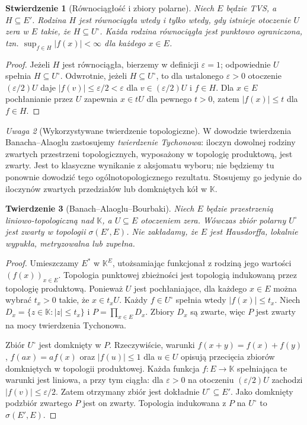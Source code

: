 \documentclass[11pt,a4paper]{article}
\numberwithin{equation}{section}
\theoremstyle{plain}
\newtheorem{twierdzenie}{Twierdzenie}[section]
\newtheorem{stwierdzenie}[twierdzenie]{Stwierdzenie}
\theoremstyle{definition}
\theoremstyle{remark}
\newtheorem{uwaga}[twierdzenie]{Uwaga}
\newcommand{\K}{\mathbb K}
\begin{document}
\begin{stwierdzenie}[Równociągłość i zbiory polarne]\label{prop:equicont-polar}
Niech $E$ będzie TVS, a $H\subseteq E'$. Rodzina $H$ jest równociągła
wtedy i tylko wtedy, gdy istnieje otoczenie $U$ zera w $E$ takie,
że $H\subseteq U^\circ$. Każda rodzina równociągła jest punktowo
ograniczona, tzn. $\sup_{f\in H}|f(x)|<\infty$ dla każdego $x\in E$.
\end{stwierdzenie}
\begin{proof}
Jeżeli $H$ jest równociągła, bierzemy w definicji $\varepsilon=1$;
odpowiednie $U$ spełnia $H\subseteq U^\circ$. Odwrotnie,
jeżeli $H\subseteq U^\circ$, to dla ustalonego $\varepsilon>0$
otoczenie $(\varepsilon/2)U$ daje
$|f(v)|\le\varepsilon/2<\varepsilon$ dla $v\in(\varepsilon/2)U$
i $f\in H$. Dla $x\in E$ pochłanianie przez $U$ zapewnia
$x\in tU$ dla pewnego $t>0$, zatem $|f(x)|\le t$ dla $f\in H$.
\end{proof}

\begin{uwaga}[Wykorzystywane twierdzenie topologiczne]
W dowodzie twierdzenia Banacha--Alaoglu zastosujemy \emph{twierdzenie
Tychonowa}: iloczyn dowolnej rodziny zwartych przestrzeni topologicznych,
wyposażony w topologię produktową, jest zwarty. Jest to klasyczne
wynikanie z aksjomatu wyboru; nie będziemy tu ponownie dowodzić
tego ogólnotopologicznego rezultatu. Stosujemy go jedynie do iloczynów
zwartych przedziałów lub domkniętych kół w $\K$.
\end{uwaga}

\begin{twierdzenie}[Banach--Alaoglu--Bourbaki]\label{thm:banach-alaoglu-general}
Niech $E$ będzie przestrzenią liniowo-topologiczną nad $\K$, a
$U\subseteq E$ otoczeniem zera. Wówczas zbiór polarny $U^\circ$
jest zwarty w topologii $\sigma(E',E)$.
Nie zakładamy, że $E$ jest Hausdorffa, lokalnie wypukła, metryzowalna
lub zupełna.
\end{twierdzenie}
\begin{proof}
Umieszczamy $E^*$ w $\K^E$, utożsamiając funkcjonał z rodziną
jego wartości $(f(x))_{x\in E}$. Topologia punktowej zbieżności
jest topologią indukowaną przez topologię produktową.
Ponieważ $U$ jest pochłaniające, dla każdego $x\in E$ można wybrać
$t_x>0$ takie, że $x\in t_xU$. Każdy $f\in U^\circ$ spełnia wtedy
$|f(x)|\le t_x$. Niech $D_x=\{z\in\K:|z|\le t_x\}$ i
$P=\prod_{x\in E}D_x$. Zbiory $D_x$ są zwarte, więc $P$ jest zwarty
na mocy twierdzenia Tychonowa.

Zbiór $U^\circ$ jest domknięty w $P$. Rzeczywiście, warunki
$f(x+y)=f(x)+f(y)$, $f(ax)=af(x)$ oraz $|f(u)|\le1$ dla $u\in U$
opisują przecięcia zbiorów domkniętych w topologii produktowej.
Każda funkcja $f:E\to\K$ spełniająca te warunki jest liniowa,
a przy tym ciągła: dla $\varepsilon>0$ na otoczeniu
$(\varepsilon/2)U$ zachodzi $|f(v)|\le\varepsilon/2$.
Zatem otrzymany zbiór jest dokładnie $U^\circ\subseteq E'$.
Jako domknięty podzbiór zwartego $P$ jest on zwarty. Topologia
indukowana z $P$ na $U^\circ$ to $\sigma(E',E)$.
\end{proof}
\end{document}
